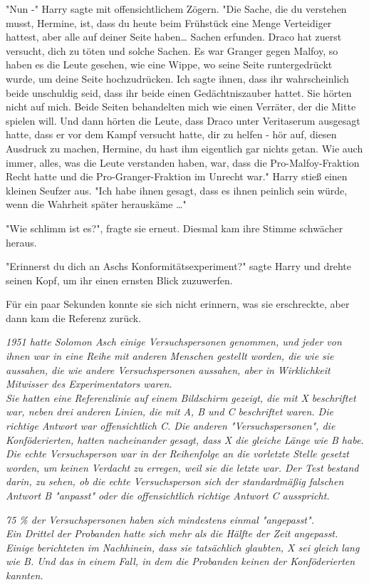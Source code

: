{"Nun -" Harry sagte mit offensichtlichem Zögern. "Die Sache, die du verstehen musst, Hermine, ist, dass du heute beim Frühstück eine Menge Verteidiger hattest, aber alle auf deiner Seite haben… Sachen erfunden. Draco hat zuerst versucht, dich zu töten und solche Sachen. Es war Granger gegen Malfoy, so haben es die Leute gesehen, wie eine Wippe, wo seine Seite runtergedrückt wurde, um deine Seite hochzudrücken. Ich sagte ihnen, dass ihr wahrscheinlich beide unschuldig seid, dass ihr beide einen Gedächtniszauber hattet. Sie hörten nicht auf mich. Beide Seiten behandelten mich wie einen Verräter, der die Mitte spielen will. Und dann hörten die Leute, dass Draco unter Veritaserum ausgesagt hatte, dass er vor dem Kampf versucht hatte, dir zu helfen - hör auf, diesen Ausdruck zu machen, Hermine, du hast ihm eigentlich gar nichts getan. Wie auch immer, alles, was die Leute verstanden haben, war, dass die Pro-Malfoy-Fraktion Recht hatte und die Pro-Granger-Fraktion im Unrecht war." Harry stieß einen kleinen Seufzer aus. "Ich habe ihnen gesagt, dass es ihnen peinlich sein würde, wenn die Wahrheit später herauskäme …"

"Wie schlimm ist es?", fragte sie erneut. Diesmal kam ihre Stimme schwächer heraus.

"Erinnerst du dich an Aschs Konformitätsexperiment?" sagte Harry und drehte seinen Kopf, um ihr einen ernsten Blick zuzuwerfen.

Für ein paar Sekunden konnte sie sich nicht erinnern, was sie erschreckte, aber dann kam die Referenz zurück.

\emph{1951 hatte Solomon Asch einige Versuchspersonen genommen, und jeder von ihnen war in eine Reihe mit anderen Menschen gestellt worden, die wie sie aussahen, die wie andere Versuchspersonen aussahen, aber in Wirklichkeit Mitwisser des Experimentators waren.}\\ \emph{Sie hatten eine Referenzlinie auf einem Bildschirm gezeigt, die mit X beschriftet war, neben drei anderen Linien, die mit A, B und C beschriftet waren. Die richtige Antwort war offensichtlich C. Die anderen "Versuchspersonen", die Konföderierten, hatten nacheinander gesagt, dass X die gleiche Länge wie B habe. Die echte Versuchsperson war in der Reihenfolge an die vorletzte Stelle gesetzt worden, um keinen Verdacht zu erregen, weil sie die letzte war. Der Test bestand darin, zu sehen, ob die echte Versuchsperson sich der standardmäßig falschen Antwort B "anpasst" oder die offensichtlich richtige Antwort C ausspricht.}

\emph{75 \% der Versuchspersonen haben sich mindestens einmal "angepasst".}\\ \emph{Ein Drittel der Probanden hatte sich mehr als die Hälfte der Zeit angepasst.}\\ \emph{Einige berichteten im Nachhinein, dass sie tatsächlich glaubten, X sei gleich lang wie B. Und das in einem Fall, in dem die Probanden keinen der Konföderierten kannten.}

}
